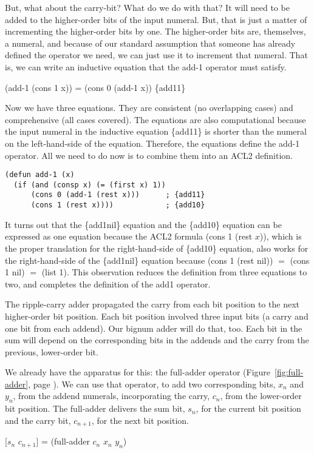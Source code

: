 But, what about the carry-bit? What do we do with that?
It will need to be added to the higher-order bits of
the input numeral. But, that is just a matter of incrementing
the higher-order bits by one.
The higher-order bits are, themselves, a numeral,
and because of our standard assumption that
someone has already defined the operator we need,
we can just use it to increment that numeral.
That is, we can write an inductive equation that the add-1 operator
must satisfy.

\hspace{1cm}  (add-1 (cons 1 x)) = (cons 0 (add-1 x))   \hfill \{add11\}

Now we have three equations.
They are consistent (no overlapping cases) and
comprehensive (all cases covered).
The equations are also computational because the input numeral in
the inductive equation \{add11\} is shorter than
the numeral on the left-hand-side of the equation.
Therefore, the equations define the add-1 operator.
All we need to do now is to combine them into an ACL2 definition.

\label{add-1-defun}
\begin{Verbatim}
(defun add-1 (x)
  (if (and (consp x) (= (first x) 1))
      (cons 0 (add-1 (rest x)))      ; {add11}
      (cons 1 (rest x))))            ; {add10}
\end{Verbatim}

It turns out that the \{add1nil\} equation
and the \{add10\} equation can be expressed as one equation because
the ACL2 formula (cons 1 (rest $x$)), which is the proper
translation for the right-hand-side of \{add10\} equation,
also works for the right-hand-side of the \{add1nil\} equation
because (cons 1 (rest nil)) $=$ (cons 1 nil) $=$ (list 1).
This observation reduces the definition from three equations to two,
and completes the definition of the add1 operator.

The ripple-carry adder propagated the carry from each bit position
to the next higher-order bit position.
Each bit position involved three input bits
(a carry and one bit from each addend).
Our bignum adder will do that, too.
Each bit in the sum will depend on the
corresponding bits in the addends and the carry from
the previous, lower-order bit.

We already have the apparatus for this: the full-adder operator
(Figure~\ref{fig:full-adder},  page \pageref{fig:full-adder}).
We can use that operator, to add two corresponding bits, 
$x_n$ and $y_n$, from the addend numerals,
incorporating the carry, $c_n$, from the lower-order bit position.
The full-adder delivers the sum bit, $s_n$, for the current
bit position and the carry bit, $c_{n+1}$, for the next bit position.
\begin{center}
[$s_n$ $c_{n+1}$] = (full-adder $c_n$ $x_n$ $y_n$)
\end{center}

